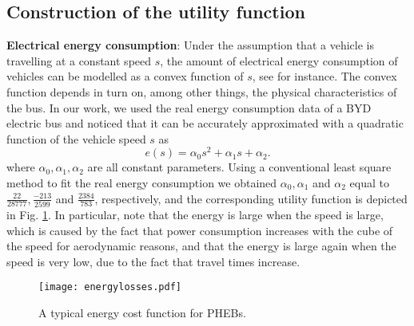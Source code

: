 \documentclass[journal]{IEEEtran}
\begin{document}
\subsection{Construction of the utility function}
\label{Utility_Functions}
\textbf{Electrical energy consumption}:
Under the assumption that a vehicle is travelling at a constant speed $s$, the amount of electrical energy consumption of vehicles can be modelled as a convex function of $s$, see \cite{vanHaaren,energyconsumption} for instance. The convex function depends in turn on, among other things, the physical characteristics of the bus. In our work, we used the real energy consumption data of a BYD electric bus \cite{energyconsumption} and noticed that it can be accurately approximated with a quadratic function of the vehicle speed $s$ as
\begin{equation}
e(s) = \alpha_0 s^2  + \alpha_1 s + \alpha_2.
\label{power_consumption}
\end{equation}
where $\alpha_0, \alpha_1, \alpha_2$ are all constant parameters. Using a conventional least square method to fit the real energy consumption we obtained $\alpha_0, \alpha_1 $ and $\alpha_2$ equal to $\frac{22}{28777}, \frac{-213}{2599}$ and $\frac{2384}{783}$, respectively, and the corresponding utility function is depicted in Fig. \ref{energyLosses}. In particular, note that the energy is large when the speed is large, which is caused by the fact that power consumption increases with the cube of the speed for aerodynamic reasons, and that the energy is large again when the speed is very low, due to the fact that travel times increase.
\begin{figure}[htbp]
	\begin{center}
		\hspace{0.4cm}
		{\texttt{[image: energylosses.pdf]}}
		\caption{A typical energy cost function for PHEBs.}
		\label{energyLosses}
	\end{center}
\end{figure}
\end{document}
